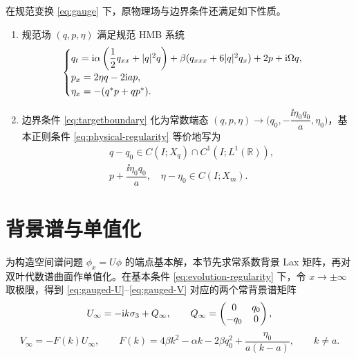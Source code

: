 \begin{remark}\label{rem:gauged-regularity}
在规范变换 \eqref{eq:gauge} 下，原物理场与边界条件还满足如下性质。
\begin{enumerate}[(1)]
\item 规范场 $(q,p,\eta)$ 满足规范 HMB 系统
\begin{equation}\label{eq:gauged-HMB}
\begin{cases}
q_t=\mathrm{i}\alpha\left(\dfrac{1}{2}q_{xx}+|q|^2q\right)
+\beta(q_{xxx}+6|q|^2q_x)+2p+\mathrm{i}\Omega q,\\
p_x=2\eta q-2\mathrm{i} ap,\\
\eta_x=-({q}^{*}p+q{p}^{*}).
\end{cases}
\end{equation}
\item 边界条件 \eqref{eq:targetboundary} 化为常数端态 $(q,p,\eta)\to\bigl(q_0,-\dfrac{\ii\eta_0q_0}{a},\eta_0\bigr)$，基本正则条件 \eqref{eq:physical-regularity} 等价地写为
\begin{equation}\label{eq:evolution-regularity}
\begin{aligned}
&q-q_0\in C(I;X_q)\cap C^1(I;L^1(\mathbb R)),\\
&p+\dfrac{\ii\eta_0q_0}{a},\quad\eta-\eta_0\in C(I;X_m).
\end{aligned}
\end{equation}
\end{enumerate}
\end{remark}

\section{背景谱与单值化}

为构造空间谱问题 $\phi_x=U\phi$ 的端点基本解，本节先求常系数背景 Lax 矩阵，再对双叶代数谱曲面作单值化\cite{ZhangFan2020}。在基本条件 \eqref{eq:evolution-regularity} 下，令 $x\to\pm\infty$ 取极限，得到 \eqref{eq:gauged-U}--\eqref{eq:gauged-V} 对应的两个常背景谱矩阵
\begin{equation}\label{eq:background-spatial}
U_\infty=-\mathrm{i} k\sigma_3+Q_\infty,\qquad
Q_\infty=\begin{pmatrix}0&q_0\\-q_0&0\end{pmatrix},
\end{equation}
\begin{equation}\label{eq:F}
V_\infty=-F(k)U_\infty,\qquad
F(k)=4\beta k^2-\alpha k-2\beta q_0^2+\dfrac{\eta_0}{a(k-a)},\qquad k\ne a.
\end{equation}


